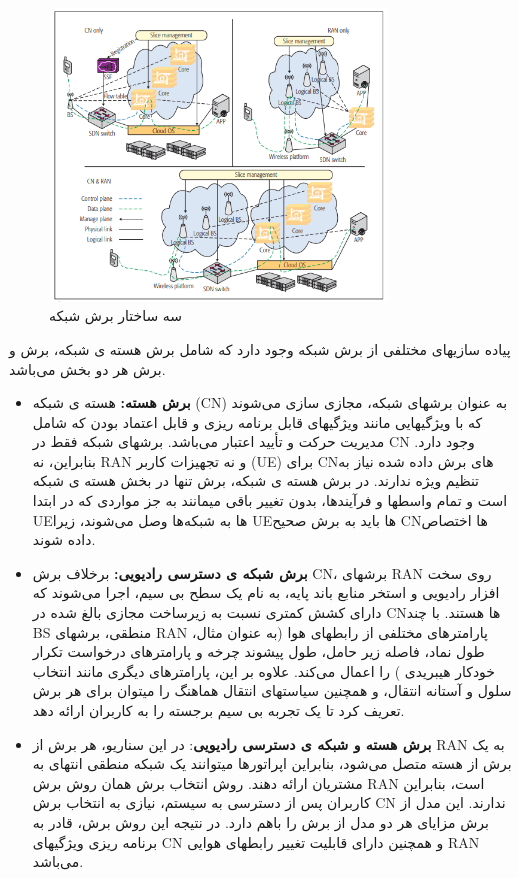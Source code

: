\begin{figure}
  \centering
    \includegraphics[width=0.8\textwidth]{./fig/NS}
  \caption{سه ساختار برش شبکه \cite{NS2}}
  \label{fig:NS}
\end{figure} 
پیاده سازیهای مختلفی از برش شبکه وجود دارد که شامل برش هسته ی شبکه، برش  و برش هر دو بخش می‌باشد\cite{NS2}.
\begin{itemize}
\item \textbf{برش هسته:}
هسته ی شبکه (CN) 
به عنوان برشهای شبکه، مجازی سازی می‌شوند که با ویژگیهایی مانند ویژگیهای قابل برنامه ریزی و قابل اعتماد بودن که شامل مدیریت حرکت و تأیید اعتبار می‌باشد.
برشهای شبکه فقط در CN وجود دارد.
  بنابراین، نه RAN و نه تجهیزات کاربر (UE) برای CNهای برش داده شده نیاز به تنظیم ویژه ندارند.
  در برش هسته ی شبکه، برش تنها در بخش هسته ی شبکه است و تمام واسطها و فرآیندها، بدون تغییر باقی میمانند
  به جز مواردی که در ابتدا UEها به شبکه‌‌ها وصل می‌شوند، زیرا UEها باید به برش صحیح CNها اختصاص داده شوند.
\item \textbf{
برش شبکه ی دسترسی رادیویی:
}
برخلاف برش CN،
برشهای RAN روی سخت افزار رادیویی و استخر منابع باند پایه، به نام یک سطح بی سیم، اجرا می‌شوند که دارای کشش کمتری نسبت به زیرساخت مجازی بالغ شده در CNها هستند.
با چند BS منطقی، برشهای RAN پارامترهای مختلفی از رابطهای هوا (به عنوان مثال، طول نماد، فاصله زیر حامل، طول پیشوند چرخه و پارامترهای درخواست تکرار خودکار هیبریدی ) را اعمال می‌کند.
علاوه بر این، پارامترهای دیگری مانند انتخاب سلول و آستانه انتقال، و همچنین سیاستهای انتقال هماهنگ را میتوان برای هر برش تعریف کرد تا یک تجربه بی سیم برجسته را به کاربران ارائه دهد.
\item \textbf{برش هسته و شبکه ی دسترسی رادیویی}:
در این سناریو، هر برش از RAN به یک برش از هسته متصل می‌شود، بنابراین اپراتورها میتوانند یک شبکه منطقی انتهای به مشتریان ارائه دهند.
روش انتخاب برش همان روش برش RAN است، بنابراین کاربران پس از دسترسی به سیستم، نیازی به انتخاب برش CN ندارند.
این مدل از برش مزایای هر دو مدل از برش را باهم دارد.
 در نتیجه این روش برش، قادر به برنامه ریزی ویژگیهای CN و همچنین دارای قابلیت تغییر رابطهای هوایی RAN
 می‌باشد.
 
\end{itemize}
